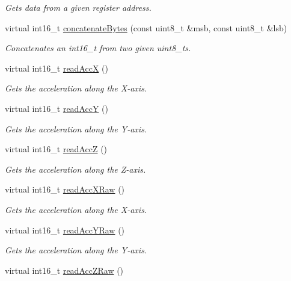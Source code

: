 \begin{DoxyCompactItemize}
\begin{DoxyCompactList}\small\item\em Gets data from a given register address. \end{DoxyCompactList}\item 
virtual int16\+\_\+t \hyperlink{classMpu6050_ae3064b01d13a3ec5288d490a94cf5109}{concatenate\+Bytes} (const uint8\+\_\+t \&msb, const uint8\+\_\+t \&lsb)
\begin{DoxyCompactList}\small\item\em Concatenates an int16\+\_\+t from two given uint8\+\_\+t\textquotesingle{}s. \end{DoxyCompactList}\item 
virtual int16\+\_\+t \hyperlink{classMpu6050_aa79e259de84f90235cc62e7fa10d2ebe}{read\+AccX} ()
\begin{DoxyCompactList}\small\item\em Gets the acceleration along the X-\/axis. \end{DoxyCompactList}\item 
virtual int16\+\_\+t \hyperlink{classMpu6050_aee59cc7d2af6f37d0b559d15070069eb}{read\+AccY} ()
\begin{DoxyCompactList}\small\item\em Gets the acceleration along the Y-\/axis. \end{DoxyCompactList}\item 
virtual int16\+\_\+t \hyperlink{classMpu6050_a5b29cdb8209e51e810cc859acdd90fa7}{read\+AccZ} ()
\begin{DoxyCompactList}\small\item\em Gets the acceleration along the Z-\/axis. \end{DoxyCompactList}\item 
virtual int16\+\_\+t \hyperlink{classMpu6050_a531fe38ae4d91c404863b594bb022ed3}{read\+Acc\+X\+Raw} ()
\begin{DoxyCompactList}\small\item\em Gets the acceleration along the X-\/axis. \end{DoxyCompactList}\item 
virtual int16\+\_\+t \hyperlink{classMpu6050_a3196a0eba88490f3699ddb50dc902604}{read\+Acc\+Y\+Raw} ()
\begin{DoxyCompactList}\small\item\em Gets the acceleration along the Y-\/axis. \end{DoxyCompactList}\item 
virtual int16\+\_\+t \hyperlink{classMpu6050_a6d8a3f3f3a8935fb9349bfd7a6e9d2e6}{read\+Acc\+Z\+Raw} ()

\end{DoxyCompactItemize}
